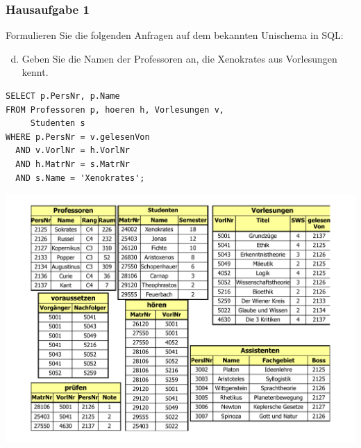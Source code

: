 \begin{frame}[fragile]
	\frametitle{Hausaufgabe 1}
	\vspace{0.5cm}

	\begin{multicols}{2}
		Formulieren Sie die folgenden Anfragen auf dem bekannten Unischema in SQL:
		\begin{enumerate}[a)]
			\setcounter{enumi}{3}
			\item Geben Sie die Namen der Professoren an, die Xenokrates aus Vorlesungen kennt.
		\end{enumerate}
		\begin{verbatim}
SELECT p.PersNr, p.Name
FROM Professoren p, hoeren h, Vorlesungen v,
	 Studenten s
WHERE p.PersNr = v.gelesenVon
  AND v.VorlNr = h.VorlNr
  AND h.MatrNr = s.MatrNr
  AND s.Name = 'Xenokrates';
		\end{verbatim}
		\vfill\columnbreak

		\begin{center}
			\includegraphics[height=.6\paperheight]{../img/uni.pdf}
		\end{center}
	\end{multicols}
\end{frame}

